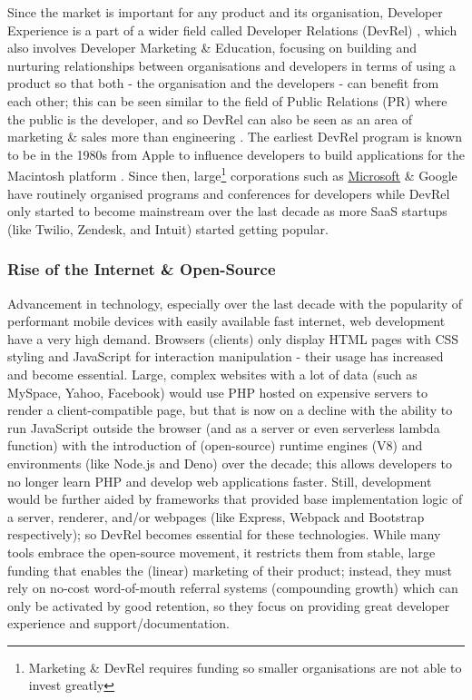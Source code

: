 Since the market is important for any product and its organisation, Developer Experience is a part of a wider field called Developer Relations (DevRel) \cite{bookFrameworkDeveloperRelations2021}, which also involves Developer Marketing \& Education, focusing on building and nurturing relationships between organisations and developers in terms of using a product so that both - the organisation and the developers - can benefit from each other; this can be seen similar to the field of Public Relations (PR) where the public is the developer, and so DevRel can also be seen as an area of marketing \& sales more than engineering \cite{communications8thDevRelSurvey2021}. The earliest DevRel program is known to be in the 1980s from Apple to influence developers to build applications for the Macintosh platform \cite{WhatDeveloperRelations2019}. Since then, large\footnote{Marketing \& DevRel requires funding so smaller organisations are not able to invest greatly} corporations such as \href{https://www.youtube.com/watch?v=Vhh_GeBPOhs}{Microsoft} \& Google have routinely organised programs and conferences for developers while DevRel only started to become mainstream over the last decade as more SaaS startups (like Twilio, Zendesk, and Intuit) started getting popular.

\subsubsection*{Rise of the Internet \& Open-Source}\label{sec:Background}%

Advancement in technology, especially over the last decade with the popularity of performant mobile devices with easily available fast internet, web development have a very high demand. Browsers (clients) only display HTML pages with CSS styling and JavaScript for interaction manipulation - their usage has increased and become essential. Large, complex websites with a lot of data (such as MySpace, Yahoo, Facebook) would use PHP hosted on expensive servers to render a client-compatible page, but that is now on a decline with the ability to run JavaScript outside the browser (and as a server or even serverless lambda function) with the introduction of (open-source) runtime engines (V8) and environments (like Node.js and Deno) over the decade; this allows developers to no longer learn PHP and develop web applications faster. Still, development would be further aided by frameworks that provided base implementation logic of a server, renderer, and/or webpages (like Express, Webpack and Bootstrap respectively); so DevRel becomes essential for these technologies. While many tools embrace the open-source movement, it restricts them from stable, large funding that enables the (linear) marketing of their product; instead, they must rely on no-cost word-of-mouth referral systems (compounding growth) which can only be activated by good retention, so they focus on providing great developer experience and support/documentation.

